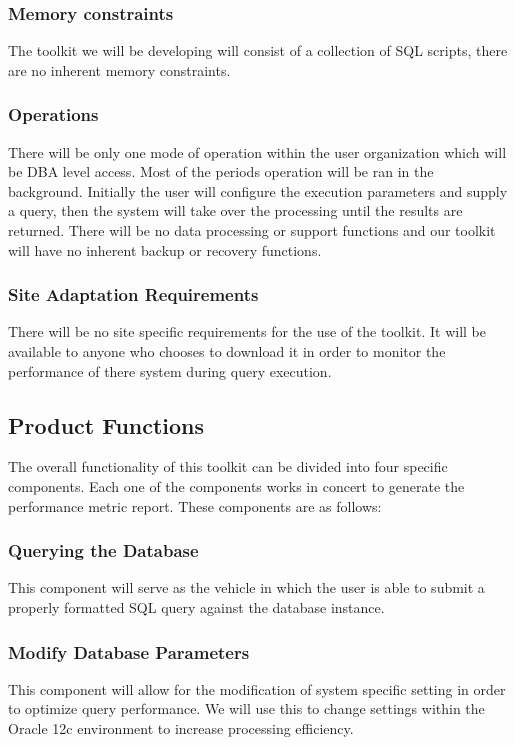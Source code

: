 \documentclass[draftclsnofoot, onecolumn, compsoc, 10pt]{IEEEtran}
\begin{document}
\subsubsection{Memory constraints}
The toolkit we will be developing will consist of a collection of SQL scripts, there are no inherent memory constraints. 

\subsubsection{Operations}
There will be only one mode of operation within the user organization which will be DBA level access.
Most of the periods operation will be ran in the background. Initially the user will configure the execution parameters and supply a query, then the system will take over the processing until the results are returned.
There will be no data processing or support functions and our toolkit will have no inherent backup or recovery functions.

\subsubsection{Site Adaptation Requirements}
There will be no site specific requirements for the use of the toolkit.
It will be available to anyone who chooses to download it in order to monitor the performance of there system during query execution.

\subsection{Product Functions}
The overall functionality of this toolkit can be divided into four specific components.
Each one of the components works in concert to generate the performance metric report. These components are as follows:

\subsubsection{Querying the Database}
This component will serve as the vehicle in which the user is able to submit a properly formatted SQL query against the database instance. 

\subsubsection{Modify Database Parameters}
This component will allow for the modification of system specific setting in order to optimize query performance.
We will use this to change settings within the Oracle 12c environment to increase processing efficiency.
\end{document}
